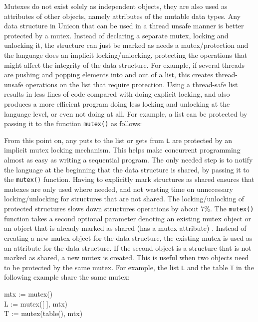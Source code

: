 Mutexes do not exist solely as independent objects, they are also used as
attributes of other objects, namely attributes of the mutable data
types. Any data structure in Unicon that can be used in a thread unsafe
manner is better protected by a mutex. Instead of declaring a separate
mutex, locking and unlocking it, the structure can just be marked as needs
a mutex/protection and the language does an implicit locking/unlocking,
protecting the operations that might affect the integrity of the data
structure.  For example, if several threads are pushing and popping
elements into and out of a list, this creates thread-unsafe operations on
the list that require protection.  Using a thread-safe list results in less
lines of code compared with doing explicit locking, and also produces a
more efficient program doing less locking and unlocking at the language
level, or even not doing at all. For example, a list can be protected by
passing it to the function \texttt{mutex()} as follows:


From this point on, any puts to the list or gets from \texttt{L} are
protected by an implicit mutex locking mechanism. This helps make
concurrent programming almost as easy as writing a sequential program.  The
only needed step is to notify the language at the beginning that the data
structure is shared, by passing it to the \texttt{mutex()} function. Having
to explicitly mark structures as shared ensures that mutexes are only used
where needed, and not wasting time on unnecessary locking/unlocking for
structures that are not shared. The locking/unlocking of protected
structures slows down structures operations by about 7\%. The
\texttt{mutex()} function takes a second optional parameter denoting an
existing mutex object or an object that is already marked as shared (has a
mutex attribute) . Instead of creating a new mutex object for the data
structure, the existing mutex is used as an attribute for the data
structure. If the second object is a structure that is not marked as
shared, a new mutex is created. This is useful when two objects need to be
protected by the same mutex. For example, the list \texttt{L} and the table
\texttt{T} in the following example share the same mutex:

\begin{iconcode}
\>mtx := mutex()\\
\>L := mutex([ ], mtx)\\
\>T := mutex(table(), mtx)\\
\end{iconcode}

